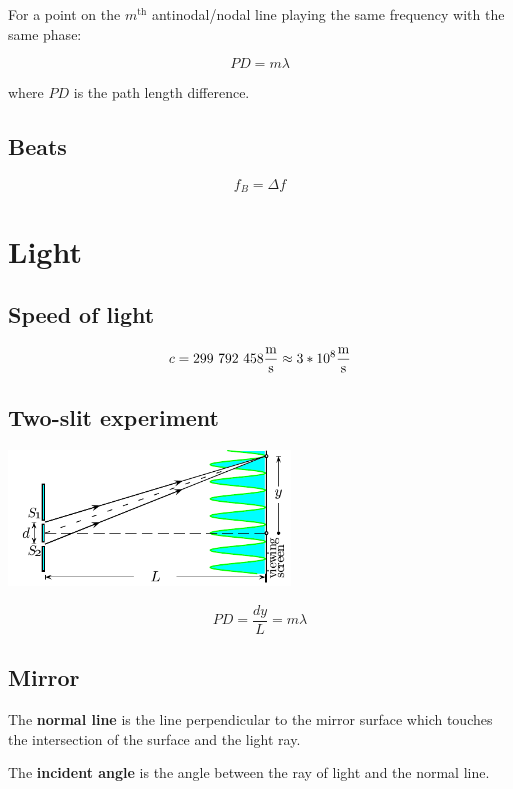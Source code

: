 For a point on the $m^\text{th}$ antinodal/nodal line playing the same frequency with the same phase:

\[
	PD = m \lambda
\]

where $PD$ is the path length difference.

\subsection{Beats}

\[
	f_B = \Delta f
\]
\section{Light}

\subsection{Speed of light}

\[
	c = 299\ 792\ 458 \frac{\meter}{\second} \approx 3 * 10^8 \frac{\meter}{\second}
\]

\subsection{Two-slit experiment}

\includegraphics[width=75mm]{content/soundlight/twoSlit}

\[
	PD = \frac{dy}{L} = m\lambda
\]

\subsection{Mirror}

The \textbf{normal line} is the line perpendicular to the mirror surface which touches the intersection of the surface and the light ray.

The \textbf{incident angle} is the angle between the ray of light and the normal line.


